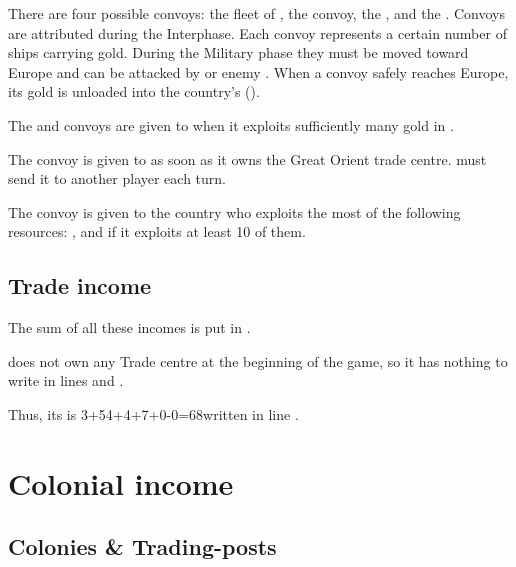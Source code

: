 \aparag There are four possible convoys: the  fleet of
, the  convoy, the ,
and the .
\bparag Convoys are attributed during the Interphase.
\bparag Each convoy represents a certain number of ships carrying
gold. During the Military phase they must be moved toward Europe and can
be attacked by \corsaire or enemy \FLEET.
\bparag When a convoy safely reaches Europe, its gold is unloaded into
the country's \RT ().

\aparag The  and  convoys are
given to \SPA when it exploits sufficiently many gold in
.

\aparag The  convoy is given to \TUR as soon as it owns
the Great Orient trade centre. \TUR must send it to another player each
turn.

\aparag The  convoy is given to the country who
exploits the most of the following resources: ,  and  if it exploits at least 10 of them.

\subsection{Trade income}
\aparag The sum of all these incomes is put in .

\begin{exemple}
  \POR does not own any Trade centre at the beginning of the game, so it
  has nothing to write in lines  and
  .

  Thus, its  is 3+54+4+7+0-0=68\ducats written in
  line .
\end{exemple}

\section{Colonial income}\label{chIncomes:ColonialIncome}
\subsection{Colonies \& Trading-posts}

